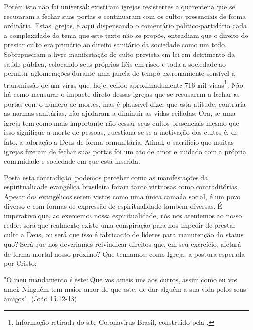 \documentclass[
    article,            %
	12pt,				%
	oneside,			%
	a4paper,			%
	chapter=TITLE,		%
	section=TITLE,		%
	english,			%
	french,				%
	spanish,			%
	brazil				%
	]{abntex2}
\begin{document}
Porém isto não foi universal: existiram igrejas resistentes a quarentena que se recusaram a fechar suas portas e continuaram com os cultos presenciais de forma ordinária. Estas igrejas, e aqui dispensando o comentário político-partidário dada a complexidade do tema que este texto não se propõe, entendiam que o direito de prestar culto era primário ao direito sanitário da sociedade como um todo. Sobrepuseram a livre manifestação de culto prevista em lei em detrimento da saúde pública, colocando seus próprios fiéis em risco e toda a sociedade ao permitir aglomerações durante uma janela de tempo extremamente sensível a transmissão de um vírus que, hoje, ceifou aproximadamente 716 mil vidas\footnote{Informação retirada do site Coronavirus Brasil, construído pela .}. Não há como mensurar o impacto direto dessas igrejas que se recusaram a fechar as portas com o número de mortes, mas é plausível dizer que esta atitude, contrária as normas sanitárias, não ajudaram a diminuir as vidas ceifadas. Ora, se uma igreja tem como mais importante não cessar seus cultos presenciais mesmo que isso signifique a morte de pessoas, questiona-se se a motivação dos cultos é, de fato, a adoração a Deus de forma comunitária. Afinal, o sacrifício que muitas igrejas fizeram de fechar suas portas foi um ato de amor e cuidado com a própria comunidade e sociedade em que está inserida.

Posta esta contradição, podemos perceber como as manifestações da espiritualidade evangélica brasileira foram tanto virtuosas como contraditórias. Apesar dos evangélicos serem vistos como uma única camada social, é um povo diverso e com formas de expressão de espiritualidade também diversas. É imperativo que, ao exercemos nossa espiritualidade, nós nos atentemos ao nosso redor: será que realmente existe uma conspiração para nos impedir de prestar culto a Deus, ou será que isso é fabricação de líderes para manutenção do status quo? Será que nós deveriamos reivindicar direitos que, em seu exercício, afetará de forma mortal nosso próximo? Que tenhamos, como Igreja, a postura esperada por Cristo: 
\begin{citacao}
"O meu mandamento é este: Que vos ameis uns aos outros, assim como eu vos amei. Ninguém tem maior amor do que este, de dar alguém a sua vida pelos seus amigos". (João 15.12-13)	
\end{citacao}


\pagebreak
\renewcommand{\bibname}{{REFER\^ENCIAS}}

\end{document}
